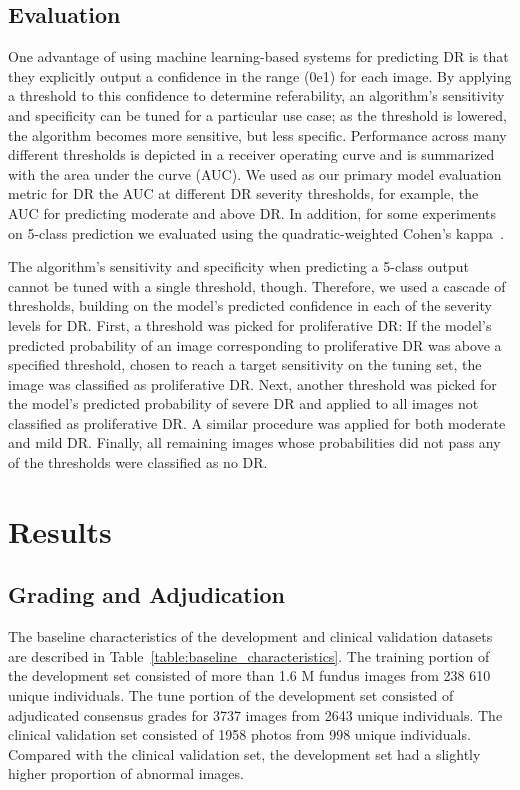 \documentclass{llncs}
\begin{document}
\subsection{Evaluation}
One advantage of using machine learning-based systems for predicting DR is that they explicitly output a confidence in the range (0e1) for each image. By applying a threshold to this confidence to determine referability, an algorithm's sensitivity and specificity can be tuned for a particular use case; as the threshold is lowered, the algorithm becomes more sensitive, but less specific. Performance across many different thresholds is depicted in a receiver operating curve and is summarized with the area under the curve (AUC). We used as our primary model evaluation metric for DR the AUC at different DR severity thresholds, for example, the AUC for predicting moderate and above DR. In addition, for some experiments on 5-class prediction we evaluated using the quadratic-weighted Cohen's kappa~\cite{cohen1960coefficient}.

The algorithm's sensitivity and specificity when predicting a 5-class output cannot be tuned with a single threshold, though.  Therefore, we used a cascade of thresholds, building on the model's predicted confidence in each of the severity levels for DR. First, a threshold was picked for proliferative DR: If the model's predicted probability of an image corresponding to proliferative DR was above a specified threshold, chosen to reach a target sensitivity on the tuning set, the image was classified as proliferative DR. Next, another threshold was picked for the model's predicted probability of severe DR and applied to all images not classified as proliferative DR. A similar procedure was applied for both moderate and mild DR. Finally, all remaining images whose probabilities did not pass any of the thresholds were classified as no DR.


\section{Results}
\subsection{Grading and Adjudication}
The baseline characteristics of the development and clinical validation datasets are described in Table~\ref{table:baseline_characteristics}. The training portion of the development set consisted of more than 1.6 M fundus images from 238 610 unique individuals. The tune portion of the development set consisted of adjudicated consensus grades for 3737 images from 2643 unique individuals. The clinical validation set consisted of 1958 photos from 998 unique individuals. Compared with the clinical validation set, the development set had a slightly higher proportion of abnormal images.
\end{document}
